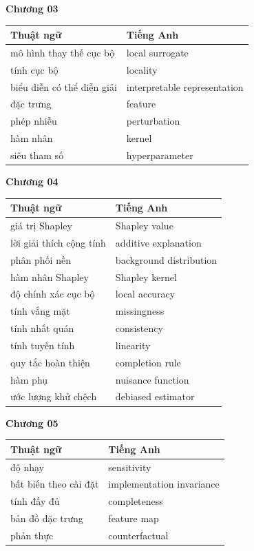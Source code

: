 \medskip

\textbf{Chương 03}

\begin{tabular}{@{}lp{7cm}@{}}
\toprule
Thuật ngữ & Tiếng Anh \\
\midrule
mô hình thay thế cục bộ & local surrogate \\
tính cục bộ & locality \\
biểu diễn có thể diễn giải & interpretable representation \\
đặc trưng & feature \\
phép nhiễu & perturbation \\
hàm nhân & kernel \\
siêu tham số & hyperparameter \\
\bottomrule
\end{tabular}

\medskip

\textbf{Chương 04}

\begin{tabular}{@{}lp{7cm}@{}}
\toprule
Thuật ngữ & Tiếng Anh \\
\midrule
giá trị Shapley & Shapley value \\
lời giải thích cộng tính & additive explanation \\
phân phối nền & background distribution \\
hàm nhân Shapley & Shapley kernel \\
độ chính xác cục bộ & local accuracy \\
tính vắng mặt & missingness \\
tính nhất quán & consistency \\
tính tuyến tính & linearity \\
quy tắc hoàn thiện & completion rule \\
hàm phụ & nuisance function \\
ước lượng khử chệch & debiased estimator \\
\bottomrule
\end{tabular}

\medskip

\textbf{Chương 05}

\begin{tabular}{@{}lp{7cm}@{}}
\toprule
Thuật ngữ & Tiếng Anh \\
\midrule
độ nhạy & sensitivity \\
bất biến theo cài đặt & implementation invariance \\
tính đầy đủ & completeness \\
bản đồ đặc trưng & feature map \\
phản thực & counterfactual \\
\bottomrule
\end{tabular}

